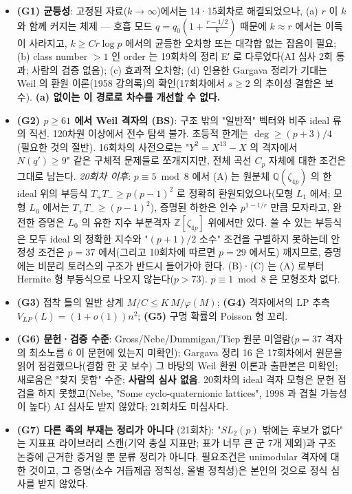 \begin{itemize}
\tightlist
\item
  \textbf{(G1) 균등성}: 고정된 자료(\(k\to\infty\))에서는 14·15회차로 해결되었으나, (a) \(r\) 이 \(k\) 와 함께 커지는 체제 --- 호흡 모드 \(q=q_0(1+\frac{r-1/2}k)\) 때문에 \(k\approx r\) 에서는 이득이 사라지고, \(k\ge Cr\log p\) 에서의 균등한 오차항 또는 대각합 없는 잡음이 필요; (b) class number \(>1\) 인 order 는 19회차의 정리 E′ 로 다루었다(AI 심사 2회 통과; 사람의 검증 없음); (c) 효과적 오차항; (d) 인용한 Gargava 정리가 기대는 Weil 의 환원 이론(1958 강의록)의 확인(17회차에서 \(s\ge2\) 의 추이성 결함은 보수). \textbf{(a) 없이는 이 경로로 차수를 개선할 수 없다.}
\item
  \textbf{(G2) \(p\ge61\) 에서 Weil 격자의 (BS)}: 구조 밖의 "일반적" 벡터와 비주 ideal 류의 직선. 120차원 이상에서 전수 탐색 불가. 초등적 한계는 \(\deg\ge(p+3)/4\) (필요한 것의 절반). 16회차의 사전으로는 "\(Y^2=X^{13}-X\) 의 격자에서 \(N(q')\ge9\)" 같은 구체적 문제들로 쪼개지지만, 전체 곡선 \(C_p\) 자체에 대한 조건은 그대로 남는다. \emph{20회차 이후}: \(p\equiv5\bmod8\) 에서 (A) 는 원분체 \(\mathbb Q(\zeta_{4p})\) 의 한 ideal 위의 부등식 \(T_+T_-\ge p(p-1)^2\) 로 정확히 환원되었으나(모형 \(L_1\) 에서; 모형 \(L_0\) 에서는 \(T_+T_-\ge(p-1)^2\)), 증명된 하한은 인수 \(p^{1-1/r}\) 만큼 모자라고, 완전한 증명은 \(L_0\) 의 유한 지수 부분격자 \(\mathbb Z[\zeta_{4p}]\) 위에서만 있다. 쓸 수 있는 부등식은 모두 ideal 의 정확한 지수와 "\((p+1)/2\) 소수" 조건을 구별하지 못하는데 안정성 조건은 \(p=37\) 에서(그리고 10회차에 따르면 \(p=29\) 에서도) 깨지므로, 증명에는 비분리 토러스의 구조가 반드시 들어가야 한다. (B)·(C) 는 (A) 로부터 Hermite 형 부등식으로 나오지 않는다(\(p>73\)). \(p\equiv1\bmod8\) 은 모형조차 없다.
\item
  \textbf{(G3)} 접착 틀의 일반 상계 \(M/C\le K\,M/\varphi(M)\); \textbf{(G4)} 격자에서의 LP 추측 \(V_{LP}(L)=(1+o(1))n^2\); \textbf{(G5)} 구멍 확률의 Poisson 형 꼬리.
\item
  \textbf{(G6) 문헌·검증 수준}: Gross/Nebe/Dummigan/Tiep 원문 미열람(\(p=37\) 격자의 최소노름 6 이 문헌에 있는지 미확인); Gargava 정리 16 은 17회차에서 원문을 읽어 점검했으나(결함 한 곳 보수) 그 바탕의 Weil 환원 이론과 출판본은 미확인; 새로움은 "찾지 못함" 수준; \textbf{사람의 심사 없음}. 20회차의 ideal 격자 모형은 문헌 점검을 하지 못했고(Nebe, "Some cyclo-quaternionic lattices", 1998 과 겹칠 가능성이 높다) AI 심사도 받지 않았다; 21회차도 미심사다.
\item
  \textbf{(G7) 다른 족의 부재는 정리가 아니다} (21회차): "\(SL_2(p)\) 밖에는 후보가 없다" 는 지표표 라이브러리 스캔(기약 충실 지표만; 표가 너무 큰 군 7개 제외)과 구조 논증에 근거한 증거일 뿐 분류 정리가 아니다. 필요조건은 unimodular 격자에 대한 것이고, 그 증명(소수 거듭제곱 정칙성, 올별 정칙성)은 본인의 것으로 정식 심사를 받지 않았다.

\end{itemize}
